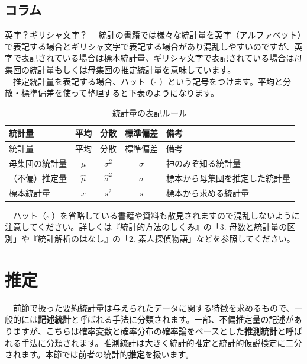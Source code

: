 \documentclass[
  12pt,
]{book}
\begin{document}
\hypertarget{ux30b3ux30e9ux30e0-1}{%
\subsection*{コラム}\label{ux30b3ux30e9ux30e0-1}}

\begin{info-box}{英字？ギリシャ文字？}
　統計の書籍では様々な統計量を英字（アルファベット）で表記する場合とギリシャ文字で表記する場合があり混乱しやすいのですが、英字で表記されている場合は標本統計量、ギリシャ文字で表記されている場合は母集団の統計量もしくは母集団の推定統計量を意味しています。\\
　推定統計量を表記する場合、ハット（ \(\hat{}\) ）という記号をつけます。平均と分散・標準偏差を使って整理すると下表のようになります。

\begin{longtable}[]{@{}lcccl@{}}
\caption{統計量の表記ルール}\tabularnewline
\toprule
統計量 & 平均 & 分散 & 標準偏差 & 備考 \\
\midrule
\endfirsthead
\toprule
統計量 & 平均 & 分散 & 標準偏差 & 備考 \\
\midrule
\endhead
母集団の統計量 & \(\mu\) & \(\sigma^2\) & \(\sigma\) & 神のみぞ知る統計量 \\
（不偏）推定量 & \(\hat{\mu}\) & \(\hat{\sigma}^2\) & \(\hat{\sigma}\) & 標本から母集団を推定した統計量 \\
標本統計量 & \(\bar{x}\) & \(s^2\) & \(s\) & 標本から求める統計量 \\
\bottomrule
\end{longtable}

　ハット（ \(\hat{}\) ）を省略している書籍や資料も散見されますので混乱しないように注意してください。詳しくは『統計的方法のしくみ』\citep{ToukeitekiHouhounoSikumi:jbook}の「3. 母数と統計量の区別」や『統計解析のはなし』\citep{ToukeiKaisekinoHanashi}の「2. 素人探偵物語」などを参照してください。

\end{info-box}

\newpage

\hypertarget{ux63a8ux5b9a}{%
\section{推定}\label{ux63a8ux5b9a}}

　前節で扱った要約統計量は与えられたデータに関する特徴を求めるもので、一般的には\textbf{記述統計}と呼ばれる手法に分類されます。一部、不偏推定量の記述がありますが、こちらは確率変数と確率分布の確率論をベースとした\textbf{推測統計}と呼ばれる手法に分類されます。推測統計は大きく統計的推定と統計的仮説検定に二分されます。本節では前者の統計的\textbf{推定}を扱います。
\end{document}

